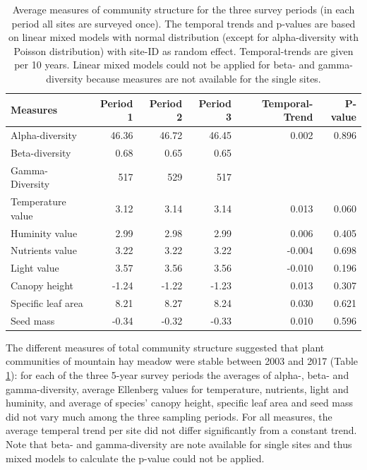 \documentclass[fleqn,10pt,lineno]{wlpeerj} %
\begin{document}
\begin{table}[ht]
\centering
\begin{tabular}{lrrrrr}
  \hline
Measures & Period 1 & Period 2 & Period 3 & Temporal-Trend & P-value \\ 
  \hline
Alpha-diversity & 46.36 & 46.72 & 46.45 & 0.002 & 0.896 \\ 
  Beta-diversity & 0.68 & 0.65 & 0.65 &  &  \\ 
  Gamma-Diversity & 517 & 529 & 517 &  &  \\ 
  Temperature value & 3.12 & 3.14 & 3.14 & 0.013 & 0.060 \\ 
  Huminity value & 2.99 & 2.98 & 2.99 & 0.006 & 0.405 \\ 
  Nutrients value & 3.22 & 3.22 & 3.22 & -0.004 & 0.698 \\ 
  Light value & 3.57 & 3.56 & 3.56 & -0.010 & 0.196 \\ 
  Canopy height & -1.24 & -1.22 & -1.23 & 0.013 & 0.307 \\ 
  Specific leaf area & 8.21 & 8.27 & 8.24 & 0.030 & 0.621 \\ 
  Seed mass & -0.34 & -0.32 & -0.33 & 0.010 & 0.596 \\ 
   \hline
\end{tabular}
\caption{Average measures of community structure for the three survey periods (in each period all sites are surveyed once). The temporal trends and p-values are based on linear mixed models with normal distribution (except for alpha-diversity with Poisson distribution) with site-ID as random effect. Temporal-trends are given per 10 years. Linear mixed models could not be applied for beta- and gamma-diversity because measures are not available for the single sites.} 
\label{temporaltrends}
\end{table}

The different measures of total community structure suggested that plant
communities of mountain hay meadow were stable between 2003 and 2017
(Table \ref{temporaltrends}): for each of the three 5-year survey
periods the averages of alpha-, beta- and gamma-diversity, average
Ellenberg values for temperature, nutrients, light and huminity, and
average of species' canopy height, specific leaf area and seed mass did
not vary much among the three sampling periods. For all measures, the
average temperal trend per site did not differ significantly from a
constant trend. Note that beta- and gamma-diversity are note available
for single sites and thus mixed models to calculate the p-value could
not be applied.
\end{document}

